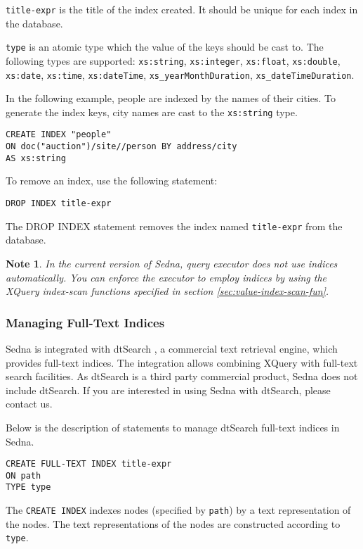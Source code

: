 \documentclass[a4paper,12pt]{article}
\newtheorem{note}{Note}
\begin{document}
\verb!title-expr! is the title of the index created.
It should be unique for each index in the database.

\verb!type! is an atomic type which the value of the keys should be cast to.
The following types are supported: \verb!xs:string!, \verb!xs:integer!,
\verb!xs:float!, \verb!xs:double!, \verb!xs:date!, \verb!xs:time!,
\verb!xs:dateTime!, \verb!xs_yearMonthDuration!, \verb!xs_dateTimeDuration!.

In the following example, people are indexed by the names of their cities. 
To generate the index keys, city names are cast to the \verb!xs:string! type.

\begin{verbatim}
CREATE INDEX "people"
ON doc("auction")/site//person BY address/city
AS xs:string
\end{verbatim}

To remove an index, use the following statement:
\begin{verbatim}
DROP INDEX title-expr
\end{verbatim}

The DROP INDEX statement removes the index named \verb!title-expr! from
the database.

\begin{note}In the current version of Sedna, query executor does not use
indices automatically. You can enforce the executor to employ indices by
using the XQuery index-scan functions specified in section
\ref{sec:value-index-scan-fun}.
\end{note}


\subsubsection{Managing Full-Text Indices}
\label{sec:managing-ft-indices}
Sedna is integrated with dtSearch \cite{link:dtsearch-engine}, a commercial text retrieval engine, which provides full-text indices. The integration allows combining XQuery with full-text search facilities. As dtSearch is a third party commercial product, Sedna does not include dtSearch. If you are interested in using Sedna with dtSearch, please contact us.

Below is the description of statements to manage dtSearch full-text indices in Sedna.

\begin{verbatim}
CREATE FULL-TEXT INDEX title-expr
ON path
TYPE type
\end{verbatim}

The \verb!CREATE INDEX! indexes nodes (specified by \verb!path!) by a text representation of the nodes. The text representations of the nodes are constructed according to \verb!type!.
\end{document}

